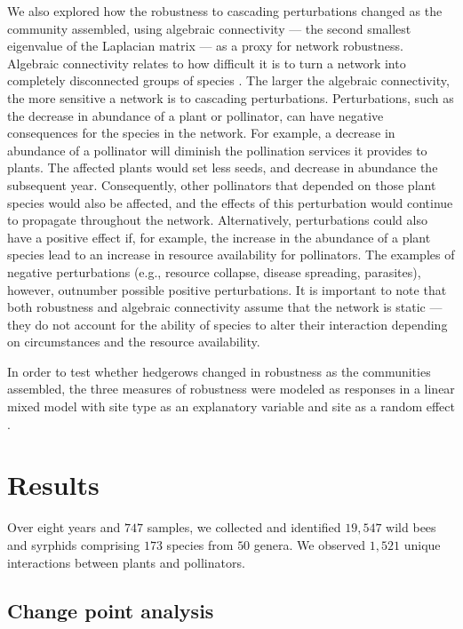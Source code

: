 \documentclass[12pt]{article}
\begin{document}
We also explored how the robustness to cascading perturbations changed
as the community assembled, using algebraic connectivity --- the
second smallest eigenvalue of the Laplacian matrix
\citep{fiedler1973algebraic} --- as a proxy for network robustness.
Algebraic connectivity relates to how difficult it is to turn a
network into completely disconnected groups of species
\citep{costa2007characterization, gibert2013spatial}. The larger the
algebraic connectivity, the more sensitive a network is to cascading
perturbations. Perturbations, such as the decrease in abundance of a
plant or pollinator, can have negative consequences for the species in
the network. For example, a decrease in abundance of a pollinator will
diminish the pollination services it provides to plants. The affected
plants would set less seeds, and decrease in abundance the subsequent
year. Consequently, other pollinators that depended on those plant
species would also be affected, and the effects of this perturbation
would continue to propagate throughout the network. Alternatively,
perturbations could also have a positive effect if, for example, the
increase in the abundance of a plant species lead to an increase in
resource availability for pollinators. The examples of negative
perturbations (e.g., resource collapse, disease spreading, parasites),
however, outnumber possible positive perturbations. It is important to
note that both robustness and algebraic connectivity assume that the
network is static --- they do not account for the ability of species
to alter their interaction depending on circumstances and the resource
availability.

In order to test whether hedgerows changed in robustness as the
communities assembled, the three measures of robustness were modeled
as responses in a linear mixed model with site type as an explanatory
variable and site as a random effect \citep{lme4, lmetest}.

\section*{Results}
\label{sec:results}

Over eight years and $747$ samples, we collected and identified
$19,547$ wild bees and syrphids comprising $173$ species from $50$
genera. We observed $1,521$ unique interactions between plants and
pollinators.

\subsection*{Change point analysis}
\end{document}
